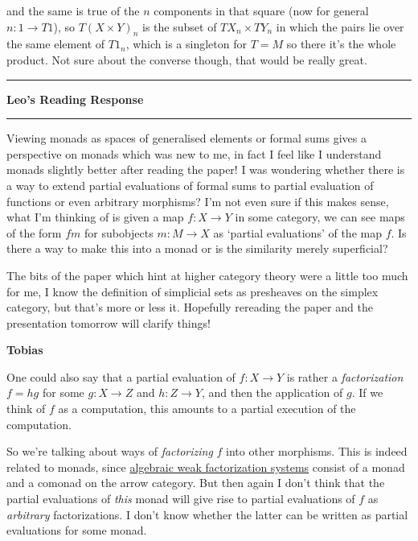 \documentclass{amsart}
\newcommand{\iam}[1]{
  \vspace{0.25em}
  \hrule
  \vspace{0.25em}
  \textbf{{#1}'s Reading Response}
  \vspace{0.25em}
  \hrule
  \vspace{1em}
}
\newcommand{\respond}[1]{
  \vspace{1em} \textbf{#1}
}
\begin{document}
\begin{center}\end{center}

and the same is true of the $n$ components in that square (now for general $n : 1 \to T1$), so $T(X \times Y)_n$ is the subset of $TX_n \times TY_n$ in which the pairs lie over the same element of $T1_n$, which is a singleton for $T=M$ so there it's the whole product.  Not sure about the converse though, that would be really great.


\iam{Leo}

Viewing monads as spaces of generalised elements or formal sums gives a perspective on monads which was new to me, in fact I feel like I understand monads slightly better after reading the paper! I was wondering whether there is a way to extend partial evaluations of formal sums to partial evaluation of functions or even arbitrary morphisms? I'm not even sure if this makes sense, what I'm thinking of is given a map $f:X\rightarrow Y$ in some category, we can see maps of the form $fm$ for subobjects $m:M\rightarrow X$ as `partial evaluations' of the map $f$. Is there a way to make this into a monad or is the similarity merely superficial?

The bits of the paper which hint at higher category theory were a little too much for me, I know the definition of simplicial sets as presheaves on the simplex category, but that's more or less it. Hopefully rereading the paper and the presentation tomorrow will clarify things!

\respond{Tobias}

One could also say that a partial evaluation of $f : X\rightarrow Y$ is rather a \emph{factorization} $f = hg$ for some $g : X \to Z$ and $h : Z \to Y$, and then the application of $g$. If we think of $f$ as a computation, this amounts to a partial execution of the computation.

So we're talking about ways of \emph{factorizing} $f$ into other morphisms. This is indeed related to monads, since \href{https://ncatlab.org/nlab/show/algebraic+weak+factorization+system}{algebraic weak factorization systems} consist of a monad and a comonad on the arrow category. But then again I don't think that the partial evaluations of \emph{this} monad will give rise to partial evaluations of $f$ as \emph{arbitrary} factorizations. I don't know whether the latter can be written as partial evaluations for some monad.
\end{document}
